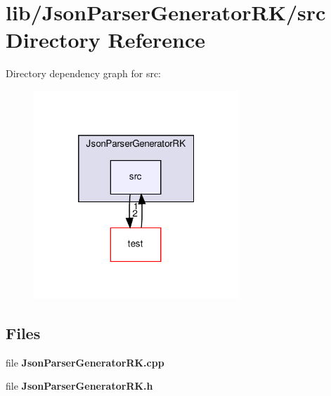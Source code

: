 \section{lib/\+Json\+Parser\+Generator\+R\+K/src Directory Reference}
\label{dir_b93d7129c7ff26de6eb36bb514d90b4e}
Directory dependency graph for src\+:\nopagebreak
\begin{figure}[H]
\begin{center}
\leavevmode
\includegraphics[width=219pt]{dir_b93d7129c7ff26de6eb36bb514d90b4e_dep}
\end{center}
\end{figure}
\subsection*{Files}
\begin{DoxyCompactItemize}
\item 
file \textbf{ Json\+Parser\+Generator\+R\+K.\+cpp}
\item 
file \textbf{ Json\+Parser\+Generator\+R\+K.\+h}
\end{DoxyCompactItemize}

